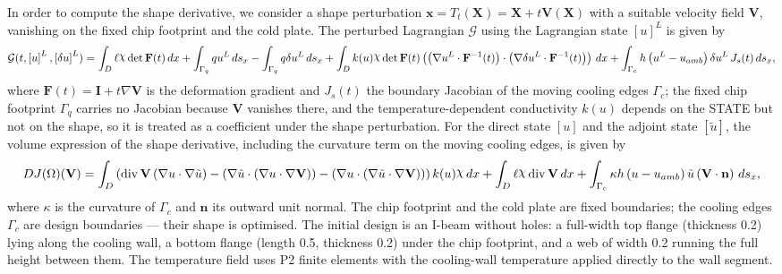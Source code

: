 \documentclass[preview]{standalone}
\let\oldcdot\cdot
\let\cdot\oldcdot
\begin{document}
In order to compute the shape derivative, we consider a shape perturbation $\mathbf x = T_t(\mathbf X) = \mathbf X + t \mathbf  V(\mathbf X)$ with a suitable velocity field $\mathbf V$, vanishing on the fixed chip footprint and the cold plate.  The perturbed Lagrangian $\mathcal G$ using the Lagrangian state $\left[ u\right]^{L}$ is given by
\begin{dmath*}
\mathcal G(t,\left[ u\right]^{L},\left[ \delta u\right]^{L}) = \int_{D} \ell \raisebox{\depth}{$\chi$}  \operatorname{det}\mathbf F( t )  \,dx + \int_{\Gamma_q} q u^{L} \,ds_x -  \int_{\Gamma_q} q  \delta u^{L} \,ds_x +  \int_{D} k(u) \raisebox{\depth}{$\chi$}  \operatorname{det}\mathbf F( t )  \left( \left(  \nabla u^{L} \cdot  \mathbf F^{-1}(t) \right) \cdot \left(  \nabla \delta u^{L} \cdot  \mathbf F^{-1}(t) \right) \right) \,dx + \int_{\Gamma_c} h \left( u^{L} - u_{amb}\right) \delta u^{L} \,J_{s}(t) \,ds_x ,
\end{dmath*}
where $\mathbf F(t) = \mathbf I + t \nabla \mathbf V$ is the deformation gradient and $J_{s}(t)$ the boundary Jacobian of the moving cooling edges $\Gamma_c$; the fixed chip footprint $\Gamma_q$ carries no Jacobian because $\mathbf V$ vanishes there, and the temperature-dependent conductivity $k(u)$ depends on the STATE but not on the shape, so it is treated as a coefficient under the shape perturbation.
For the direct state $\left[ u\right]$ and the adjoint state $\left[ \tilde u\right]$, the volume expression of the shape derivative, including the curvature term on the moving cooling edges, is given by
\begin{dmath*}
DJ(\Omega)(\mathbf V) = \int_{D} \left(\operatorname{div} {\mathbf V} \left(  \nabla u  \cdot  \nabla \tilde u  \right) - \left(  \nabla \tilde u  \cdot \left(  \nabla u  \cdot  \nabla {\mathbf V}  \right) \right) - \left(  \nabla u  \cdot \left(  \nabla \tilde u  \cdot  \nabla {\mathbf V}  \right) \right)\right) k(u) \raisebox{\depth}{$\chi$} \,dx + \int_{D} \ell \raisebox{\depth}{$\chi$} \operatorname{div} {\mathbf V} \,dx + \int_{\Gamma_c} \kappa h \left( u - u_{amb}\right) \tilde u \left(\mathbf V \cdot \mathbf n\right) \,ds_x ,
\end{dmath*}
where $\kappa$ is the curvature of $\Gamma_c$ and $\mathbf n$ its outward unit normal.  The chip footprint and the cold plate are fixed boundaries; the cooling edges $\Gamma_c$ are design boundaries — their shape is optimised.
The initial design is an I-beam without holes: a full-width top flange (thickness 0.2) lying along the cooling wall, a bottom flange (length 0.5, thickness 0.2) under the chip footprint, and a web of width 0.2 running the full height between them.  The temperature field uses P2 finite elements with the cooling-wall temperature applied directly to the wall segment.
\end{document}
